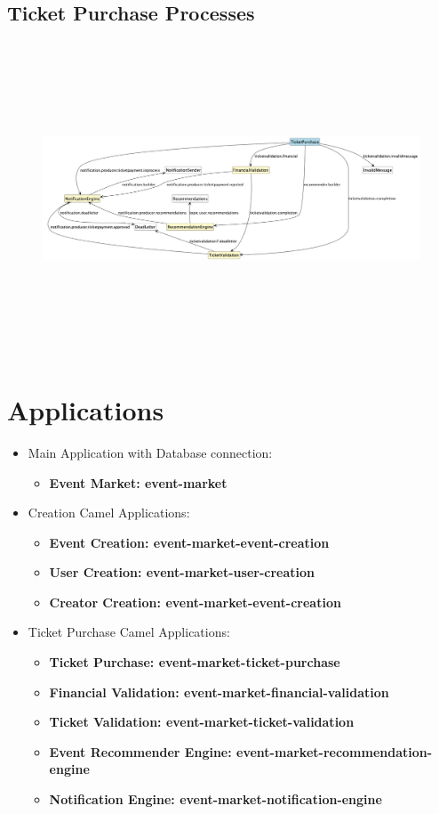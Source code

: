 \documentclass{article}
\newcommand{\application}[1]{\textbf{\textcolor{codegreen}{#1}}}
\begin{document}
\FloatBarrier
\subsection{Ticket Purchase Processes}
\begin{figure}[h]
    \centering
    \includegraphics[width=\textwidth, height=350px, keepaspectratio]{assets/uml/structure/Purchase.png}
\end{figure}

\FloatBarrier
\section{Applications}
\begin{itemize}
    \item Main Application with Database connection:
    \begin{itemize}
        \item \application{Event Market: event-market}
    \end{itemize}
    \item Creation Camel Applications:
    \begin{itemize}
        \item \application{Event Creation: event-market-event-creation}
        \item \application{User Creation: event-market-user-creation}
        \item \application{Creator Creation: event-market-event-creation}
    \end{itemize}
    \item Ticket Purchase Camel Applications:
    \begin{itemize}
        \item \application{Ticket Purchase: event-market-ticket-purchase}
        \item \application{Financial Validation: event-market-financial-validation}
        \item \application{Ticket Validation: event-market-ticket-validation}
        \item \application{Event Recommender Engine: event-market-recommendation-engine}
        \item \application{Notification Engine: event-market-notification-engine}
    \end{itemize}
\end{itemize}
\end{document}
